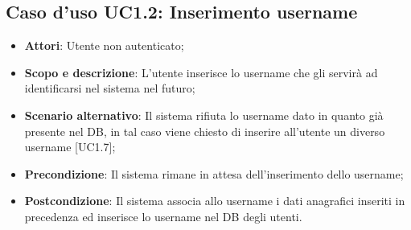 \documentclass[12pt,a4paper,titlepage]{article}
\begin{document}
	\subsection{Caso d'uso UC1.2: Inserimento username}
	\label{UC1.2}
	\begin{itemize}
		\item \textbf{Attori}: Utente non autenticato;
		\item \textbf{Scopo e descrizione}: L'utente inserisce lo username che gli servirà ad identificarsi nel sistema nel futuro;
		\item \textbf{Scenario alternativo}: Il sistema rifiuta lo username dato in quanto già presente nel DB, in tal caso viene chiesto di inserire all'utente un diverso username [UC1.7];
		\item \textbf{Precondizione}: Il sistema rimane in attesa dell'inserimento dello username;
		\item \textbf{Postcondizione}: Il sistema associa allo username i dati anagrafici inseriti in precedenza ed inserisce lo username nel DB degli utenti.
	\end{itemize}
\end{document}
